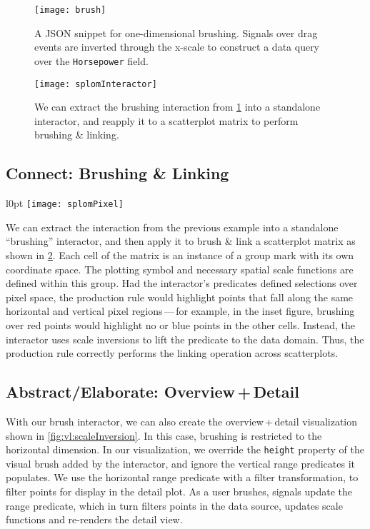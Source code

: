 \newpage

\begin{figure}[h!]
  \centering
  \texttt{[image: brush]}
  \caption{A JSON snippet for one-dimensional brushing. Signals over drag
  events are inverted through the x-scale to construct a data query over the
  \texttt{Horsepower} field.}
  \label{fig:vg:brush}
\end{figure}

\begin{figure}[h!]
  \centering
  \texttt{[image: splomInteractor]}
  \caption{We can extract the brushing interaction from \cref{fig:vg:brush}
  into a standalone interactor, and reapply it to a scatterplot matrix to
  perform brushing \& linking.}
  \label{fig:vg:splomInteractor}
\end{figure}

\newpage

\subsection{Connect: Brushing \& Linking}

\begin{wrapfigure}{l}{0pt}
  \texttt{[image: splomPixel]}
\end{wrapfigure}

We can extract the interaction from the previous example into a standalone
``brushing'' interactor, and then apply it to brush \& link a scatterplot matrix
as shown in \cref{fig:vg:splomInteractor}. Each cell of the matrix is an
instance of a group mark with its own coordinate space. The plotting symbol and
necessary spatial scale functions are defined within this group. Had the
interactor's predicates defined selections over pixel space, the production rule
would highlight points that fall along the same horizontal and vertical pixel
regions\,---\,for example, in the inset figure, brushing over red points would
highlight no or blue points in the other cells. Instead, the interactor uses
scale inversions to lift the predicate to the data domain. Thus, the production
rule correctly performs the linking operation across scatterplots.

\subsection{Abstract/Elaborate: Overview\,+\,Detail}

With our brush interactor, we can also create the overview\,+\,detail
visualization shown in \cref{fig:vl:scaleInversion}. In this case, brushing is
restricted to the horizontal dimension. In our visualization, we override the
\texttt{height} property of the visual brush added by the interactor, and ignore
the vertical range predicates it populates. We use the horizontal range
predicate with a filter transformation, to filter points for display in the
detail plot. As a user brushes, signals update the range predicate, which in
turn filters points in the data source, updates scale functions and re-renders
the detail view.

